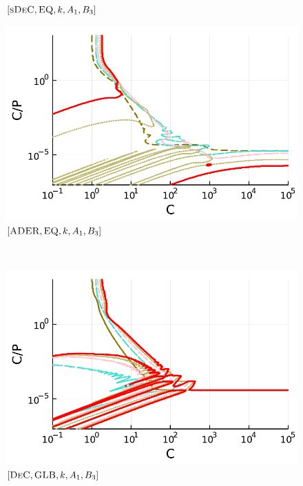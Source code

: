 \begin{figure}
\begin{minipage}[t]{0.32\textwidth}
		\small$[\textsc{sDeC}, \textsc{EQ},k, A_1,B_3]$\par
	\end{minipage}
	\begin{minipage}[t]{0.32\textwidth}
		\centering
		\includegraphics[width=\textwidth]{pdf/pdepics/disp/IMEXADER_equispaced_disp_TMM_2-6_newE.pdf}
		\small$[\textsc{ADER}, \textsc{EQ},k, A_1,B_3]$\par
	\end{minipage}\\
	\begin{minipage}[t]{0.32\textwidth}
		\centering
		\includegraphics[width=\textwidth]{pdf/pdepics/disp/IMEXDeC_gaussLobatto_disp_TMM_2-6_newE.pdf}
		\small$[\textsc{DeC}, \textsc{GLB},k, A_1,B_3]$\par
	\end{minipage}
	\begin{minipage}[t]{0.32\textwidth}
		\centering

\end{minipage}
\end{figure}
